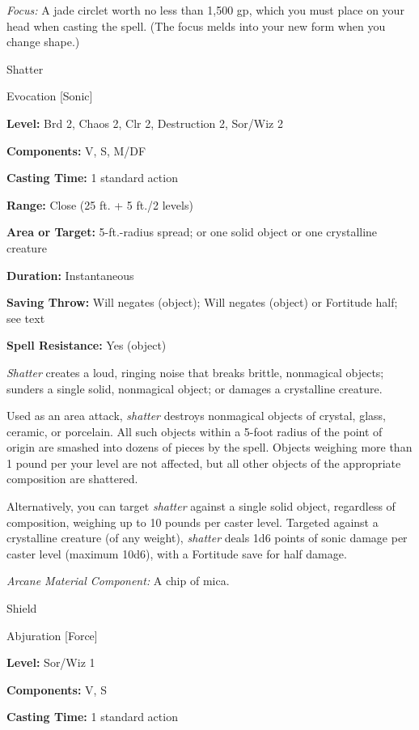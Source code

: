 \documentclass{article}
\begin{document}
\textit{Focus: }A jade circlet worth no less than 1,500 gp, which you must place 
on your head when casting the spell. (The focus melds into your new form when you 
change shape.)

\vspace{12pt}
Shatter

Evocation [Sonic]

\textbf{Level:} Brd 2, Chaos 2, Clr 2, Destruction 2, Sor/Wiz 2

\textbf{Components:} V, S, M/DF

\textbf{Casting Time:} 1 standard action

\textbf{Range:} Close (25 ft. + 5 ft./2 levels)

\textbf{Area or Target:} 5-ft.-radius spread; or one solid object or one crystalline 
creature

\textbf{Duration:} Instantaneous

\textbf{Saving Throw: }Will negates (object); Will negates (object) or Fortitude 
half; see text

\textbf{Spell Resistance:} Yes (object)

\textit{Shatter }creates a loud, ringing noise that breaks brittle, nonmagical 
objects; sunders a single solid, nonmagical object; or damages a crystalline creature.

Used as an area attack, \textit{shatter }destroys nonmagical objects of crystal, 
glass, ceramic, or porcelain. All such objects within a 5-foot radius of the point 
of origin are smashed into dozens of pieces by the spell. Objects weighing more 
than 1 pound per your level are not affected, but all other objects of the appropriate 
composition are shattered.

Alternatively, you can target \textit{shatter }against a single solid object, regardless 
of composition, weighing up to 10 pounds per caster level. Targeted against a crystalline 
creature (of any weight), \textit{shatter }deals 1d6 points of sonic damage per 
caster level (maximum 10d6), with a Fortitude save for half damage.

\textit{Arcane Material Component: }A chip of mica.

\vspace{12pt}
Shield

Abjuration [Force]

\textbf{Level:} Sor/Wiz 1

\textbf{Components:} V, S

\textbf{Casting Time:} 1 standard action
\end{document}
